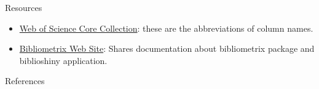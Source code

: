 \documentclass[
  ignorenonframetext,
]{beamer}
\newif\ifbibliography
\begin{document}
\begin{frame}{Resources}
\protect\hypertarget{resources}{}
\begin{itemize}
\item
  \href{https://images.webofknowledge.com/images/help/WOS/hs_wos_fieldtags.html}{Web
  of Science Core Collection}: these are the abbreviations of column
  names.
\item
  \href{https://www.bibliometrix.org/vignettes/Introduction_to_bibliometrix.html}{Bibliometrix
  Web Site}: Shares documentation about bibliometrix package and
  biblioshiny application.
\end{itemize}
\end{frame}

\renewcommand\refname{References}
\begin{frame}[allowframebreaks]{References}
  \bibliographytrue
  
\end{frame}
\end{document}
